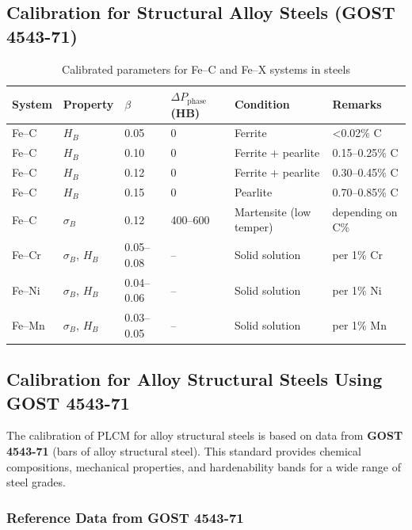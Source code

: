\documentclass[12pt,a4paper]{article}
\begin{document}
	\subsection{Calibration for Structural Alloy Steels (GOST 4543-71)}
	\begin{longtable}{p{2.5cm} p{1.2cm} p{1.2cm} p{1.5cm} p{2.0cm} p{2.0cm}}
		\caption{Calibrated parameters for Fe–C and Fe–X systems in steels}\\
		\toprule
		\textbf{System} & \textbf{Property} & $\beta$ & $\Delta P_{\text{phase}}$ (HB) & \textbf{Condition} & \textbf{Remarks} \\
		\midrule
		Fe–C & $H_B$ & 0.05 & 0 & Ferrite & <0.02\% C \\
		Fe–C & $H_B$ & 0.10 & 0 & Ferrite + pearlite & 0.15–0.25\% C \\
		Fe–C & $H_B$ & 0.12 & 0 & Ferrite + pearlite & 0.30–0.45\% C \\
		Fe–C & $H_B$ & 0.15 & 0 & Pearlite & 0.70–0.85\% C \\
		Fe–C & $\sigma_B$ & 0.12 & 400–600 & Martensite (low temper) & depending on C\% \\
		Fe–Cr & $\sigma_B$, $H_B$ & 0.05–0.08 & – & Solid solution & per 1\% Cr \\
		Fe–Ni & $\sigma_B$, $H_B$ & 0.04–0.06 & – & Solid solution & per 1\% Ni \\
		Fe–Mn & $\sigma_B$, $H_B$ & 0.03–0.05 & – & Solid solution & per 1\% Mn \\
		\bottomrule
	\end{longtable}
	
	
	\subsection{Calibration for Alloy Structural Steels Using GOST 4543-71}
	\label{subsec:steel_calibration_gost4543}
	
	The calibration of PLCM for alloy structural steels is based on data from \textbf{GOST 4543-71} (bars of alloy structural steel). This standard provides chemical compositions, mechanical properties, and hardenability bands for a wide range of steel grades.
	
	\subsubsection{Reference Data from GOST 4543-71}
	
\end{document}
